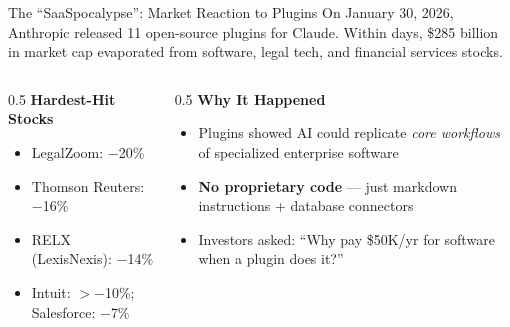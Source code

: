 \documentclass[aspectratio=169]{beamer}
\begin{document}
\begin{frame}[shrink=10]{The ``SaaSpocalypse'': Market Reaction to Plugins}
On January 30, 2026, Anthropic released 11 open-source plugins for Claude.  Within days, \alert{\$285 billion} in market cap evaporated from software, legal tech, and financial services stocks.
\vspace{0.2cm}
\begin{columns}[T]
\begin{column}{0.5\textwidth}
\textbf{Hardest-Hit Stocks}
\begin{itemize}\small
  \item LegalZoom: $-$20\%
  \item Thomson Reuters: $-$16\%
  \item RELX (LexisNexis): $-$14\%
  \item Intuit: $>-$10\%; Salesforce: $-$7\%
\end{itemize}
\end{column}
\begin{column}{0.5\textwidth}
\textbf{Why It Happened}
\begin{itemize}\small
  \item Plugins showed AI could replicate \textit{core workflows} of specialized enterprise software
  \item \textbf{No proprietary code} --- just markdown instructions + database connectors
  \item Investors asked: ``Why pay \$50K/yr for software when a plugin does it?''
\end{itemize}
\end{column}
\end{columns}
\end{frame}

\end{document}
